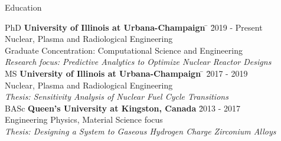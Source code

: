 \documentclass{resume2} %
\begin{document}
\centering
\iffalse
I am an engineer that is passionate about \\ 
nuclear technology and developing innovative \\
systems to face today's energy challenges.   

Gwen is passionate about nuclear power and developing \\
innovative systems to improve nuclear energy and fuel cycle\\
technologies. She wants to contribute to pressing global\\
energy challenges and environmental sustainability. 
\fi

\raggedright

\begin{rSection}{Education}
	
\begin{tabbing}
PhD \hspace*{1.5 em}\= \textbf{University of Illinois at Urbana-Champaign} \hspace*{5em} \= \hspace*{7.7em} \= 2019 - Present \\
\> Nuclear, Plasma and Radiological Engineering \\
\> Graduate Concentration: Computational Science and Engineering \\
\> \textit{Research focus: Predictive Analytics to Optimize Nuclear Reactor Designs} \\
%	
MS \hspace*{2 em}\= \textbf{University of Illinois at Urbana-Champaign} \hspace*{5em} \= \hspace*{9em} \= 2017 - 2019 \\
\> Nuclear, Plasma and Radiological Engineering \\
\> \textit{Thesis: Sensitivity Analysis of Nuclear Fuel Cycle Transitions}\\
%
BASc \hspace*{2 em}\> \textbf{Queen's University at Kingston, Canada} \> \hspace*{9em} \= 2013 - 2017 \\
\> Engineering Physics, Material Science focus \\
\> \textit{Thesis: Designing a System to Gaseous Hydrogen Charge Zirconium Alloys }
\end{tabbing}

\end{rSection}
\end{document}

